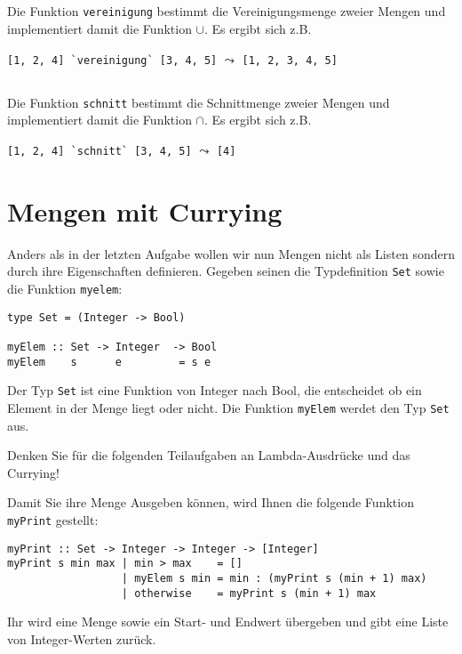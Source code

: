 \documentclass[
  10pt,                   %
  DIV12,
  german,                 %
  oneside,                %
  parskip=half,           %
  headings=normal,        %
  captions=tableheading,  %
]{scrartcl}
\begin{document}
\subsection{}
Die Funktion \lstinline|vereinigung| bestimmt die Vereinigungsmenge zweier Mengen und
implementiert damit die Funktion $\cup$. Es ergibt sich z.B.
\begin{center}
\lstinline|[1, 2, 4] `vereinigung` [3, 4, 5]|  $\leadsto$ \lstinline|[1, 2, 3, 4, 5]|
\end{center}
\subsection{}
Die Funktion \lstinline|schnitt| bestimmt die Schnittmenge zweier Mengen und implementiert
damit die Funktion $\cap$. Es ergibt sich z.B.
\begin{center}
\lstinline|[1, 2, 4] `schnitt` [3, 4, 5]| $\leadsto$ \lstinline|[4]|
\end{center}
\newpage
\section{Mengen mit Currying}
Anders als in der letzten Aufgabe wollen wir nun Mengen nicht als Listen sondern 
durch ihre Eigenschaften definieren.
Gegeben seinen die Typdefinition \lstinline|Set| sowie die Funktion \lstinline|myelem|:
\begin{lstlisting}
type Set = (Integer -> Bool)

myElem :: Set -> Integer  -> Bool
myElem    s      e         = s e
\end{lstlisting}
Der Typ \lstinline|Set| ist eine Funktion von Integer nach Bool, die entscheidet ob ein Element in der
Menge liegt oder nicht. Die Funktion \lstinline|myElem| werdet den Typ \lstinline|Set| aus. 

Denken Sie für die folgenden Teilaufgaben an Lambda-Ausdrücke und das Currying!

Damit Sie ihre Menge Ausgeben können, wird Ihnen die folgende Funktion \lstinline|myPrint| gestellt:
\begin{lstlisting}
myPrint :: Set -> Integer -> Integer -> [Integer]
myPrint s min max | min > max    = []
                  | myElem s min = min : (myPrint s (min + 1) max)
                  | otherwise    = myPrint s (min + 1) max
\end{lstlisting}
Ihr wird eine Menge sowie ein Start- und Endwert übergeben und gibt eine Liste von 
Integer-Werten zurück.
\end{document}
